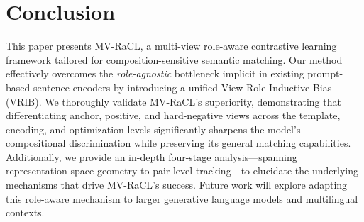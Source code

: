 \documentclass[lettersize,journal]{IEEEtran}
\begin{document}
\section{Conclusion}
\label{sec:conclusion}

This paper presents MV-RaCL, a multi-view role-aware contrastive learning framework tailored for composition-sensitive semantic matching. Our method effectively overcomes the \emph{role-agnostic} bottleneck implicit in existing prompt-based sentence encoders by introducing a unified View-Role Inductive Bias (VRIB). We thoroughly validate MV-RaCL's superiority, demonstrating that differentiating anchor, positive, and hard-negative views across the template, encoding, and optimization levels significantly sharpens the model's compositional discrimination while preserving its general matching capabilities. Additionally, we provide an in-depth four-stage analysis---spanning representation-space geometry to pair-level tracking---to elucidate the underlying mechanisms that drive MV-RaCL's success. Future work will explore adapting this role-aware mechanism to larger generative language models and multilingual contexts.

\end{document}
